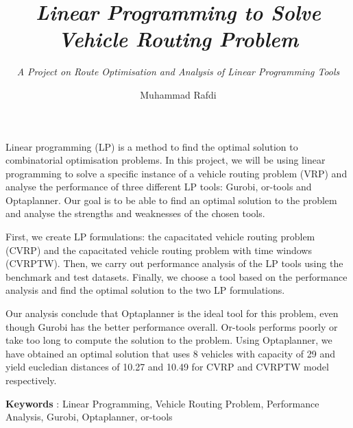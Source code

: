 \documentclass[a4paper,12pt,numbered,print,index]{report/thesisFormat}
\title{\textit{Linear Programming to Solve\\Vehicle Routing Problem}}
\subtitle{\textit{A Project on Route Optimisation and Analysis of Linear Programming Tools}}
\author{Muhammad Rafdi}
\newenvironment{romanpages}{
  \setcounter{page}{1}
  \renewcommand{\thepage}{\roman{page}}}
{\newpage\renewcommand{\thepage}{\arabic{page}}}
\begin{document}
\begin{romanpages}

\begin{titlepage}
  \maketitle
\end{titlepage}

\begin{abstract2}

    Linear programming (LP) is a method to find the optimal solution to combinatorial optimisation problems.
    In this project, we will be using linear programming to solve a specific instance of a vehicle routing problem (VRP) and
     analyse the performance of three different LP tools: Gurobi, or-tools and
    Optaplanner. Our goal is to be able to find an optimal solution to the problem and analyse the strengths and weaknesses
    of the chosen tools.

    First, we create LP formulations: the capacitated vehicle routing problem (CVRP) and the capacitated
     vehicle routing problem with time windows (CVRPTW). Then, we carry out performance
    analysis of the LP tools using the benchmark and test datasets. Finally, we choose a tool based
    on the performance analysis and find the optimal solution to the two LP formulations.

    Our analysis conclude that Optaplanner is the ideal tool for this problem, even though Gurobi has the better
    performance overall. Or-tools performs poorly or take too long to compute the solution to the problem. Using
    Optaplanner, we have obtained an optimal solution that uses 8 vehicles with capacity of 29 and yield eucledian
    distances of 10.27 and 10.49 for CVRP and CVRPTW model respectively.

   \vspace{1.5cm}
   \textbf{Keywords} : Linear Programming, Vehicle Routing Problem, Performance Analysis, Gurobi, Optaplanner, or-tools

\end{abstract2}


\setcounter{page}{1}

\tableofcontents

\listoffigures

\listoftables

\end{romanpages}
\end{document}
